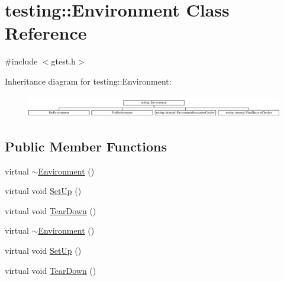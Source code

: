 \hypertarget{classtesting_1_1_environment}{\section{testing\-:\-:Environment Class Reference}
\label{classtesting_1_1_environment}
}


{\ttfamily \#include $<$gtest.\-h$>$}

Inheritance diagram for testing\-:\-:Environment\-:\begin{figure}[H]
\begin{center}
\leavevmode
\includegraphics[height=0.989399cm]{classtesting_1_1_environment}
\end{center}
\end{figure}
\subsection*{Public Member Functions}
\begin{DoxyCompactItemize}
\item 
virtual \hyperlink{classtesting_1_1_environment_a0e41c320362576d752cd1f44cabd57d4}{$\sim$\-Environment} ()
\item 
virtual void \hyperlink{classtesting_1_1_environment_a1bf8cafaa9d4eba9feb98655ee434eb3}{Set\-Up} ()
\item 
virtual void \hyperlink{classtesting_1_1_environment_a039bdaa705c46b9b88234cf4d3bb6254}{Tear\-Down} ()
\item 
virtual \hyperlink{classtesting_1_1_environment_a0e41c320362576d752cd1f44cabd57d4}{$\sim$\-Environment} ()
\item 
virtual void \hyperlink{classtesting_1_1_environment_a1bf8cafaa9d4eba9feb98655ee434eb3}{Set\-Up} ()
\item 
virtual void \hyperlink{classtesting_1_1_environment_a039bdaa705c46b9b88234cf4d3bb6254}{Tear\-Down} ()
\end{DoxyCompactItemize}


